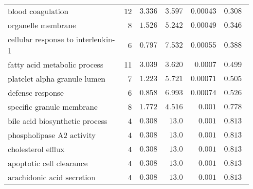 \begin{longtable}{|l|r|r|r|r|r|}
                                 blood coagulation &                      12 &                $ 3.336$ &   $ 3.597$ &            $0.00043$ &                     $ 0.308~~$ \\
                                organelle membrane &                       8 &                $ 1.526$ &   $ 5.242$ &            $0.00049$ &                     $ 0.346~~$ \\
                cellular response to interleukin-1 &                       6 &                $ 0.797$ &   $ 7.532$ &            $0.00055$ &                     $ 0.388~~$ \\
                      fatty acid metabolic process &                      11 &                $ 3.039$ &   $ 3.620$ &             $0.0007$ &                     $ 0.499~~$ \\
                      platelet alpha granule lumen &                       7 &                $ 1.223$ &   $ 5.721$ &            $0.00071$ &                     $ 0.505~~$ \\
                                  defense response &                       6 &                $ 0.858$ &   $ 6.993$ &            $0.00074$ &                     $ 0.526~~$ \\
                         specific granule membrane &                       8 &                $ 1.772$ &   $ 4.516$ &             $ 0.001$ &                     $ 0.778~~$ \\
                    bile acid biosynthetic process &                       4 &                $ 0.308$ &   $  13.0$ &             $ 0.001$ &                     $ 0.813~~$ \\
                         phospholipase A2 activity &                       4 &                $ 0.308$ &   $  13.0$ &             $ 0.001$ &                     $ 0.813~~$ \\
                                cholesterol efflux &                       4 &                $ 0.308$ &   $  13.0$ &             $ 0.001$ &                     $ 0.813~~$ \\
                          apoptotic cell clearance &                       4 &                $ 0.308$ &   $  13.0$ &             $ 0.001$ &                     $ 0.813~~$ \\
                        arachidonic acid secretion &                       4 &                $ 0.308$ &   $  13.0$ &             $ 0.001$ &                     $ 0.813~~$ \\
\end{longtable}
